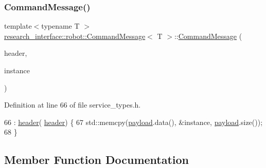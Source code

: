\mbox{\label{structresearch__interface_1_1robot_1_1CommandMessage_aaadf555f1dc8b12a08427aa8fdcbade2}} 
\subsubsection{\texorpdfstring{Command\+Message()}{CommandMessage()}\hspace{0.1cm}{\footnotesize\ttfamily [2/2]}}
{\footnotesize\ttfamily template$<$typename T $>$ \\
\hyperlink{structresearch__interface_1_1robot_1_1CommandMessage}{research\+\_\+interface\+::robot\+::\+Command\+Message}$<$ T $>$\+::\hyperlink{structresearch__interface_1_1robot_1_1CommandMessage}{Command\+Message} (\begin{DoxyParamCaption}\item[{const \hyperlink{structresearch__interface_1_1robot_1_1CommandHeader}{Command\+Header} \&}]{header,  }\item[{const T \&}]{instance }\end{DoxyParamCaption})\hspace{0.3cm}{\ttfamily [inline]}}



Definition at line 66 of file service\+\_\+types.\+h.


\begin{DoxyCode}
66                                                                  : \hyperlink{structresearch__interface_1_1robot_1_1CommandMessage_a62fe6afacf849021d3b1c5b44ef3f364}{header}(
      \hyperlink{structresearch__interface_1_1robot_1_1CommandMessage_a62fe6afacf849021d3b1c5b44ef3f364}{header}) \{
67     std::memcpy(\hyperlink{structresearch__interface_1_1robot_1_1CommandMessage_a0af29b5860ddcb6ea5724a2116f38a7a}{payload}.data(), &instance, \hyperlink{structresearch__interface_1_1robot_1_1CommandMessage_a0af29b5860ddcb6ea5724a2116f38a7a}{payload}.size());
68   \}
\end{DoxyCode}


\subsection{Member Function Documentation}
\mbox{\label{structresearch__interface_1_1robot_1_1CommandMessage_af90e44d04779770074185f82c8b024fe}} 

